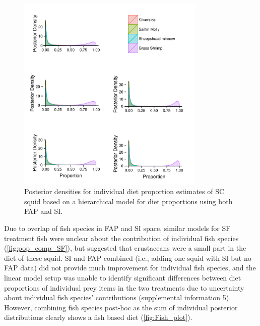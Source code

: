 \documentclass{article}%
\begin{document}
\begin{spacing}{1.9}
\begin{flushleft}
\begin{figure}
  \begin{center}
    \includegraphics[width=0.8\textwidth]{figures/Ind_FAP_SC_long.pdf}   
    \caption{Posterior densities for individual diet proportion
      estimates of SC squid based on a hierarchical
      model for diet proportions using both FAP and SI.}
    \label{fig:ind_est}
  \end{center}
\end{figure}

Due to overlap of fish species in FAP and SI space, similar models for
SF treatment fish were unclear about the contribution of individual
fish species (\autoref{fig:pop_comp_SF}), but suggested that
crustaceans were a small part in the diet of these squid. SI and FAP
combined (i.e., adding one squid with SI but no FAP data) did not
provide much improvement for individual fish species, and the linear model setup was unable to identify significant differences
between diet proportions of individual prey items in the two
treatments due to uncertainty about individual fish species'
contributions (supplemental information 5). However, combining fish species post-hoc as the sum of individual posterior
distributions clearly shows a fish based diet
(\autoref{fig:Fish_plot}). 


\end{flushleft}
\end{spacing}
\end{document}
